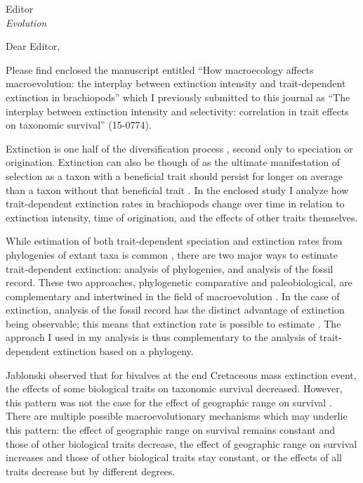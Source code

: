 \documentclass{letter}
\begin{document}
\begin{letter}{Editor \\ \textit{Evolution}}
  \opening{Dear Editor,}

  Please find enclosed the manuscript entitled ``How macroecology affects macroevolution: the interplay between extinction intensity and trait-dependent extinction in brachiopods'' which I previously submitted to this journal as ``The interplay between extinction intensity and selectivity: correlation in trait effects on taxonomic survival'' (15-0774).
  
  Extinction is one half of the diversification process \cite{Raup1994,Stanley1979,Stanley1975}, second only to speciation or origination. Extinction can also be though of as the ultimate manifestation of selection as a taxon with a beneficial trait should persist for longer on average than a taxon without that beneficial trait \cite{Rabosky2010b,Jablonski2008a,Raup1994,Stanley1975}. In the enclosed study I analyze how trait-dependent extinction rates in brachiopods change over time in relation to extinction intensity, time of origination, and the effects of other traits themselves.

  While estimation of both trait-dependent speciation and extinction rates from phylogenies of extant taxa is common \cite{Maddison2007,Fitzjohn2010,Goldberg2011a,Goldberg2005,Rabosky2013,Stadler2013b,Stadler2011a,Stadler2013a}, there are two major ways to estimate trait-dependent extinction: analysis of phylogenies, and analysis of the fossil record. These two approaches, phylogenetic comparative and paleobiological, are complementary and intertwined in the field of macroevolution \cite{Rabosky2010b,Jablonski2008a,Hunt2014a}. In the case of extinction, analysis of the fossil record has the distinct advantage of extinction being observable; this means that extinction rate is possible to estimate \cite{Rabosky2010a,Quental2009,Liow2010a}. The approach I used in my analysis is thus complementary to the analysis of trait-dependent extinction based on a phylogeny.

  Jablonski \cite{Jablonski1986} observed that for bivalves at the end Cretaceous mass extinction event, the effects of some biological traits on taxonomic survival decreased. However, this pattern was not the case for the effect of geographic range on survival \cite{Jablonski1986,Payne2007}. There are multiple possible macroevolutionary mechanisms which may underlie this pattern: the effect of geographic range on survival remains constant and those of other biological traits decrease, the effect of geographic range on survival increases and those of other biological traits stay constant, or the effects of all traits decrease but by different degrees.


\end{letter}
\end{document}

